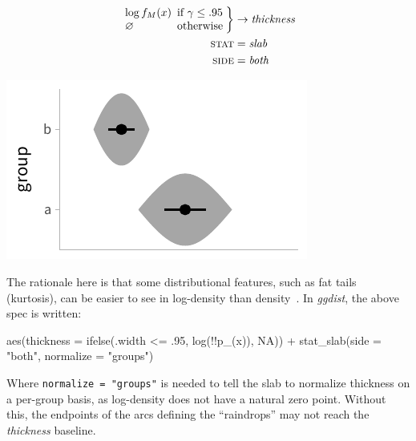 \documentclass[journal]{vgtc}                     %
\newenvironment{centerverbatim}{%
  \hfill\break
  \small
  \centering
  \varwidth{\linewidth}%
  \verbatim
}{%
  \endverbatim
  \endvarwidth
  \par
  \hfill\break
}
\begin{document}
 \noindent
\begin{minipage}{.5\columnwidth}

\begin{align*}
\arraycolsep=2.5pt \left.\begin{array}{ll} \log f_M(x) & \textrm{if } \gamma \le .95\\ \varnothing & \textrm{otherwise}\end{array}\right\} &\rightarrow \textit{thickness}\\
\textsc{stat} &= \mathit{slab}\\
\textsc{side} &= \mathit{both}
\end{align*}
\end{minipage}%
  \begin{minipage}{.4\columnwidth}
    \centering
    \includegraphics[width=1.2\columnwidth]{figs/3-slab_raindrop.pdf}
  \end{minipage}
\hfill\break

The rationale here is that some distributional features, such as fat tails (kurtosis), can be easier to see in log-density than density~\cite{barrowman2003raindrop}. In \textit{ggdist}, the above spec is written:

\begin{centerverbatim}
aes(thickness = ifelse(.width <= .95, log(!!p_(x)), NA)) +
stat_slab(side = "both", normalize = "groups")
\end{centerverbatim}

Where \texttt{normalize = "groups"} is needed to tell the slab to normalize thickness on a per-group basis, as log-density does not have a natural zero point. Without this, the endpoints of the arcs defining the ``raindrops'' may not reach the \textit{thickness} baseline.
\end{document}
